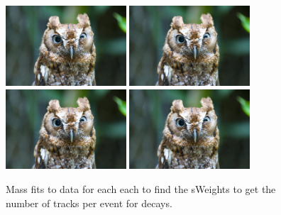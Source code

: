 \begin{figure}[ht]
  \centering
    \includegraphics[width=0.4\textwidth]{./Figs/placeholder.jpeg}
    \includegraphics[width=0.4\textwidth]{./Figs/placeholder.jpeg}
    \includegraphics[width=0.4\textwidth]{./Figs/placeholder.jpeg}
    \includegraphics[width=0.4\textwidth]{./Figs/placeholder.jpeg}
  \caption{Mass fits to \bdkpi data for each each to find the sWeights to get the number of tracks per event for \bdkpi decays.}
  \label{fig:ntracksmassifts}
\end{figure}
\FloatBarrier


